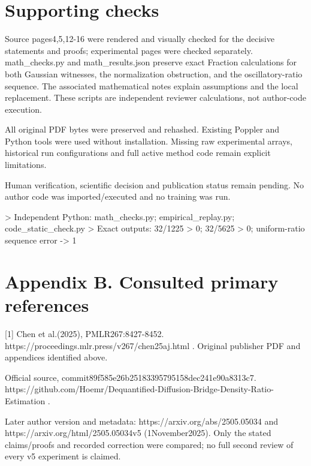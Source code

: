 \documentclass[10pt]{article}
\begin{document}
\section*{Supporting checks}
Source pages4,5,12-16 were rendered and visually checked for the decisive statements and proofs; experimental pages were checked separately. math\_checks.py and math\_results.json preserve exact Fraction calculations for both Gaussian witnesses, the normalization obstruction, and the oscillatory-ratio sequence. The associated mathematical notes explain assumptions and the local replacement. These scripts are independent reviewer calculations, not author-code execution.\par
All original PDF bytes were preserved and rehashed. Existing Poppler and Python tools were used without installation. Missing raw experimental arrays, historical run configurations and full active method code remain explicit limitations.\par
Human verification, scientific decision and publication status remain pending. No author code was imported/executed and no training was run.\par
> Independent Python: math\_checks.py; empirical\_replay.py; code\_static\_check.py
> Exact outputs: 32/1225 > 0; 32/5625 > 0; uniform-ratio sequence error -> 1\par
\section*{Appendix B. Consulted primary references}
[1] Chen et al.(2025), PMLR267:8427-8452. https://proceedings.mlr.press/v267/chen25aj.html . Original publisher PDF and appendices identified above.\par
Official source, commit89f585e26b25183395795158dec241e90a8313c7. https://github.com/Hoemr/Dequantified-Diffusion-Bridge-Density-Ratio-Estimation .\par
Later author version and metadata: https://arxiv.org/abs/2505.05034 and https://arxiv.org/html/2505.05034v5 (1November2025). Only the stated claims/proofs and recorded correction were compared; no full second review of every v5 experiment is claimed.\par
\end{document}
